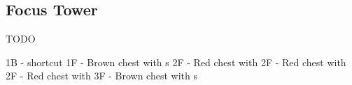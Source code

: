 \subsection{Focus Tower}
\label{map:focus_tower}

TODO

1B - shortcut 
1F - Brown chest with s
2F - Red chest with 
2F - Red chest with 
2F - Red chest with 
3F - Brown chest with s
